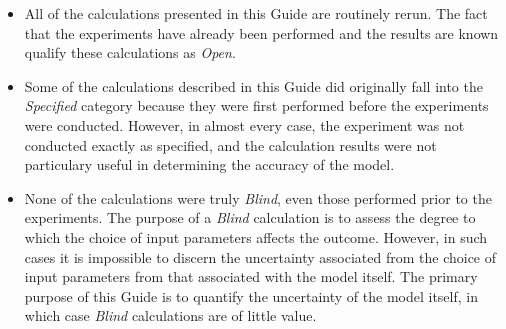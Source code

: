 \begin{itemize}
\item All of the calculations presented in this Guide are routinely rerun. The fact that the experiments have already been performed and the results are known qualify these calculations as {\em Open}.
\item Some of the calculations described in this Guide did originally fall into the {\em Specified} category because they were first performed before the experiments were conducted. However, in almost every case, the experiment was not conducted exactly as specified, and the calculation results were not particulary useful in determining the accuracy of the model. \item None of the calculations were truly {\em Blind}, even those performed prior to the experiments. The purpose of a {\em Blind} calculation is to assess the degree to which the choice of input parameters affects the outcome. However, in such cases it is impossible to discern the uncertainty associated from the choice of input parameters from that associated with the model itself. The primary purpose of this Guide is to quantify the uncertainty of the model itself, in which case {\em Blind} calculations are of little value.
\end{itemize}







